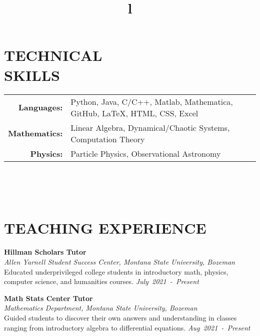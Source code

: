 \documentclass[margin]{res}
\begin{document}
\begin{resume}
\section{TECHNICAL\\SKILLS}

{
\begin{tabular}{r p{9.5cm}}
\textbf{Languages:}   & Python, Java, C/C++, Matlab, Mathematica, GitHub, \LaTeX, HTML, CSS, Excel \vspace{0.5ex}\\
\textbf{Mathematics:} & Linear Algebra, Dynamical/Chaotic Systems, Computation Theory \vspace{0.5ex} \\
\textbf{Physics:}     & Particle Physics, Observational Astronomy   \\
\end{tabular}
}




\begin{format}
\title{l}\\
\\
\body\\
\end{format}

\section{TEACHING EXPERIENCE}
\noindent
\textbf{Hillman Scholars Tutor}\\
{\sl Allen Yarnell Student Success Center, Montana State University, Bozeman}\\\vspace{0.5ex}
Educated underprivileged college students in introductory math, physics, computer science, and humanities courses. \hfill
{\sl July~2021~-~Present}

\noindent
\raggedright
\textbf{Math Stats Center Tutor}\\
{\sl Mathematics Department, Montana State University, Bozeman}\\\vspace{0.5ex}
Guided students to discover their own answers and understanding in classes ranging from introductory algebra to differential equations. \hfill
{\sl Aug~2021~-~Present}


\end{resume}
\end{document}
